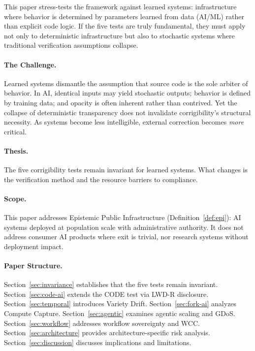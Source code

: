 \documentclass[11pt,a4paper]{article}
\theoremstyle{definition}
\begin{document}
This paper stress-tests the framework against learned systems: infrastructure where behavior is determined by parameters learned from data (AI/ML) rather than explicit code logic. If the five tests are truly fundamental, they must apply not only to deterministic infrastructure but also to stochastic systems where traditional verification assumptions collapse.

\paragraph{The Challenge.} Learned systems dismantle the assumption that source code is the sole arbiter of behavior. In AI, identical inputs may yield stochastic outputs; behavior is defined by training data; and opacity is often inherent rather than contrived. Yet the collapse of deterministic transparency does not invalidate corrigibility's structural necessity. As systems become less intelligible, external correction becomes \textit{more} critical.

\paragraph{Thesis.} The five corrigibility tests remain invariant for learned systems. What changes is the verification method and the resource barriers to compliance.

\paragraph{Scope.} This paper addresses Epistemic Public Infrastructure (Definition~\ref{def:epi}): AI systems deployed at population scale with administrative authority. It does not address consumer AI products where exit is trivial, nor research systems without deployment impact.

\paragraph{Paper Structure.} Section~\ref{sec:invariance} establishes that the five tests remain invariant. Section~\ref{sec:code-ai} extends the CODE test via LWD-R disclosure. Section~\ref{sec:temporal} introduces Variety Drift. Section~\ref{sec:fork-ai} analyzes Compute Capture. Section~\ref{sec:agentic} examines agentic scaling and GDoS. Section~\ref{sec:workflow} addresses workflow sovereignty and WCC. Section~\ref{sec:architecture} provides architecture-specific risk analysis. Section~\ref{sec:discussion} discusses implications and limitations.
\end{document}
